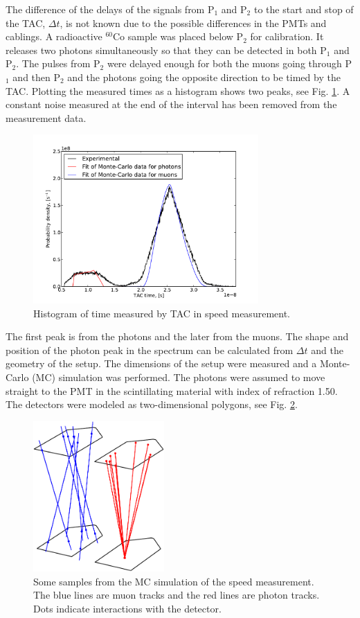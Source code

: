 \documentclass[10pt,twocolumn]{article}
\begin{document}
The difference of the delays of the signals from P$_1$ and P$_2$ to the start and stop of the TAC, $\Delta t$, is not known due to the possible differences in the PMTs and cablings. A radioactive $^{60}$Co sample was placed below P$_2$ for calibration. It releases two photons simultaneously so that they can be detected in both P$_1$ and P$_2$. The pulses from P$_2$ were delayed enough for both the muons going through P$_1$ and then P$_2$ and the photons going the opposite direction to be timed by the TAC. Plotting the measured times as a histogram shows two peaks, see Fig. \ref{speedHist}. A constant noise measured at the end of the interval has been removed from the measurement data.
\begin{figure}
\centering
\includegraphics[width=8.6cm]{speedFit.pdf}
\caption{Histogram of time measured by TAC in speed measurement.}
\label{speedHist}
\end{figure}
The first peak is from the photons and the later from the muons. The shape and position of the photon peak in the spectrum can be calculated from $\Delta t$ and the geometry of the setup. The dimensions of the setup were measured and a Monte-Carlo (MC) simulation was performed. The photons were assumed to move straight to the PMT in the scintillating material with index of refraction 1.50. The detectors were modeled as two-dimensional polygons, see Fig. \ref{MC}.
\begin{figure}
\centering
\includegraphics[width=5cm]{mc-crop.pdf}
\caption{Some samples from the MC simulation of the speed measurement. The blue lines are muon tracks and the red lines are photon tracks. Dots indicate interactions with the detector.}
\label{MC}
\end{figure}
\end{document}
